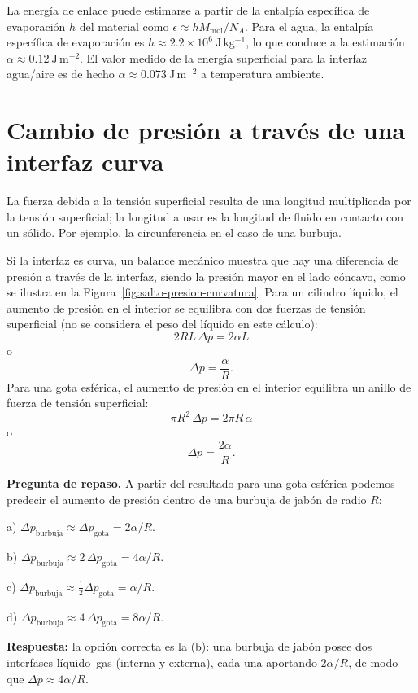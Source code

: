 La energía de enlace puede estimarse a partir de la entalpía específica de evaporación $h$ del material como $\epsilon \approx h M_{\mathrm{mol}}/N_A$. Para el agua, la entalpía específica de evaporación es $h \approx 2.2\times10^6\ \mathrm{J\,kg^{-1}}$, lo que conduce a la estimación $\alpha \approx 0.12\ \mathrm{J\,m^{-2}}$. El valor medido de la energía superficial para la interfaz agua/aire es de hecho $\alpha \approx 0.073\ \mathrm{J\,m^{-2}}$ a temperatura ambiente.

\section{Cambio de presión a través de una interfaz curva}

La fuerza debida a la tensión superficial resulta de una longitud multiplicada por la tensión superficial; la longitud a usar es la longitud de fluido en contacto con un sólido. Por ejemplo, la circunferencia en el caso de una burbuja.

\figuraSaltoPresionCurvatura

Si la interfaz es curva, un balance mecánico muestra que hay una diferencia de presión a través de la interfaz, siendo la presión mayor en el lado cóncavo, como se ilustra en la Figura~\ref{fig:salto-presion-curvatura}. Para un cilindro líquido, el aumento de presión en el interior se equilibra con dos fuerzas de tensión superficial (no se considera el peso del líquido en este cálculo):
$$ 2RL\,\Delta p = 2\alpha L $$
o
$$ \Delta p = \frac{\alpha}{R}. $$
Para una gota esférica, el aumento de presión en el interior equilibra un anillo de fuerza de tensión superficial:
$$ \pi R^2\,\Delta p = 2\pi R\,\alpha $$
o
$$ \Delta p = \frac{2\alpha}{R}. $$

\textbf{Pregunta de repaso.} A partir del resultado para una gota esférica podemos predecir el aumento de presión dentro de una burbuja de jabón de radio $R$:

a) $\Delta p_{\mathrm{burbuja}} \approx \Delta p_{\mathrm{gota}} = 2\alpha/R$.

b) $\Delta p_{\mathrm{burbuja}} \approx 2\,\Delta p_{\mathrm{gota}} = 4\alpha/R$.

c) $\Delta p_{\mathrm{burbuja}} \approx \tfrac{1}{2}\Delta p_{\mathrm{gota}} = \alpha/R$.

d) $\Delta p_{\mathrm{burbuja}} \approx 4\,\Delta p_{\mathrm{gota}} = 8\alpha/R$.

\textbf{Respuesta:} la opción correcta es la (b): una burbuja de jabón posee dos interfases líquido--gas (interna y externa), cada una aportando $2\alpha/R$, de modo que $\Delta p \approx 4\alpha/R$.

